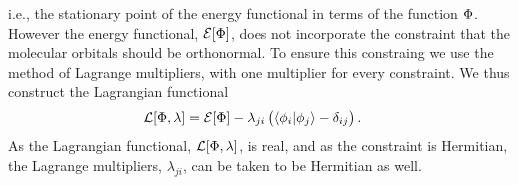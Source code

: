         i.e., the stationary point of the energy functional in terms of the
        function $\Phi$.
        However the energy functional, $\mathcal{E}[\Phi]$, does not
        incorporate the constraint that the molecular orbitals should be
        orthonormal.
        To ensure this constraing we use the method of Lagrange multipliers,
        with one multiplier for every constraint.
        We thus construct the Lagrangian functional
        \begin{align}
            \mathcal{L}[\Phi, \lambda]
            &= \mathcal{E}[\Phi]
            - \lambda_{ji}\left( 
                \langle \phi_i | \phi_j \rangle
                - \delta_{ij}
             \right).
        \end{align}
        As the Lagrangian functional, $\mathcal{L}[\Phi, \lambda]$, is
        real, and as the constraint is Hermitian, the Lagrange multipliers,
        $\lambda_{ji}$, can be taken to be Hermitian as well.

